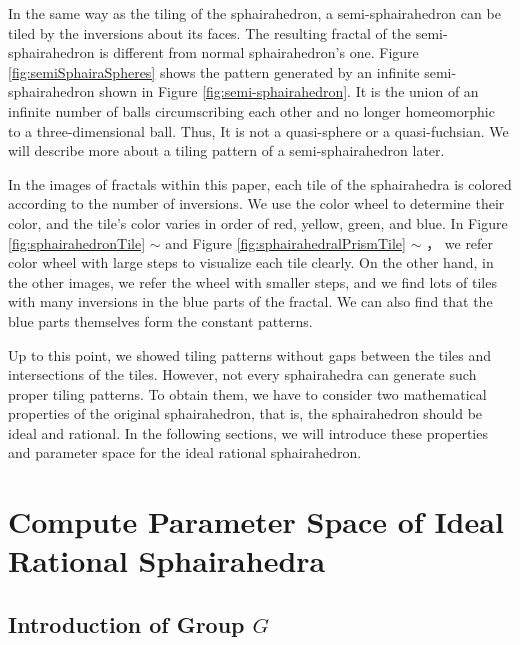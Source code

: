 \documentclass[dvipdfmx]{interact}
\theoremstyle{plain}%
\theoremstyle{definition}
\theoremstyle{remark}
\theoremstyle{problemstyle}
\begin{document}
In the same way as the tiling of the sphairahedron, a semi-sphairahedron
can be tiled by the inversions about its faces.
The resulting fractal of the semi-sphairahedron is different from normal
sphairahedron's one.
Figure \ref{fig:semiSphairaSpheres} shows the pattern
generated by an infinite semi-sphairahedron shown in Figure 
\ref{fig:semi-sphairahedron}.
It is the union of an infinite number of balls
circumscribing each other and no longer homeomorphic
to a three-dimensional ball.
Thus, It is not a quasi-sphere or a quasi-fuchsian.
We will describe more about a tiling pattern of a semi-sphairahedron later.

In the images of fractals within this paper, each tile of the
sphairahedra is colored according to the
number of inversions.
We use the color wheel to determine their color,
and the tile's color varies in order of red, yellow, green, and blue.
In Figure \ref{fig:sphairahedronTile} $\sim$  and
Figure \ref{fig:sphairahedralPrismTile} $\sim$ ，
we refer color wheel with large steps to visualize each tile clearly.
On the other hand, in the other images, we refer the wheel with smaller
steps, and we find lots of tiles with many inversions in the blue
parts of the fractal.
We can also find that the blue parts themselves form the constant
patterns.

Up to this point, we showed tiling patterns without gaps between the tiles and
intersections of the tiles.
However, not every sphairahedra can generate such proper tiling patterns.
To obtain them, we have to consider two mathematical properties
of the original sphairahedron, that is, the sphairahedron should be
ideal and rational.
In the following sections, we will introduce these properties and parameter
space for the ideal rational sphairahedron.


\section{Compute Parameter Space of Ideal Rational Sphairahedra}

\subsection{Introduction of Group $G$}
\end{document}
